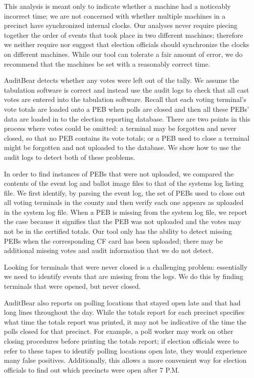 \documentclass[letterpaper,twocolumn,10pt]{article}
\begin{document}
This analysis is meant only to indicate whether a 
machine had a noticeably incorrect time; we are not concerned with whether
multiple machines in a precinct have synchronized internal clocks. Our 
analyses never require piecing together the order of events that took place in two 
different machines; therefore we neither require nor suggest that 
election officials should synchronize the clocks on different machines. While 
our tool can tolerate a fair amount of error, we do 
recommend that the machines be set with a reasonably correct time.

AuditBear detects whether any votes were left out of the tally. We assume the
tabulation software is correct and instead use the audit logs to check that all
cast votes are entered into the tabulation software. Recall that each voting
terminal's vote totals are loaded onto a PEB when polls are closed and then all
these PEBs' data are loaded in to the election reporting database. There are two
points in this process where votes could be omitted: a terminal may be forgotten
and never closed, so that no PEB contains its vote totals; or a PEB used to
close a terminal might be forgotten and not uploaded to the database. We show
how to use the audit logs to detect both of these problems.  

In order to find instances of PEBs that were not uploaded, we
compared the contents of the event log and ballot image files to that of the
systems log listing file. We first identify, by parsing the event log, the set
of PEBs used to close out all voting terminals in the county and then verify each one appears as
uploaded in the system log file. When a PEB is missing from the system log file,
we report the case because it signifies that the PEB was not uploaded and the
votes may not be in the certified totals. Our tool only has the ability to detect missing 
PEBs when the corresponding CF card has been uploaded; there may be additional missing 
votes and audit information that we do not detect.

Looking for terminals that were never closed is a challenging problem:
essentially we need to identify events that are missing from the logs. We do
this by finding terminals that were opened, but never closed.  

AuditBear also reports on polling locations that stayed open late and that had
long lines throughout the day. While the totals report for each precinct specifies 
what time the totals report was printed, it may not be indicative of the time  
the polls closed for that precinct. For example, a poll worker may work on other 
closing procedures before printing the totals report; if election officials were to 
refer to these tapes to identify polling locations open late, they would 
experience many false positives. Additionally, this allows a more convenient way for 
election officials to find out which precincts were open after 7 P.M. 
\end{document}
